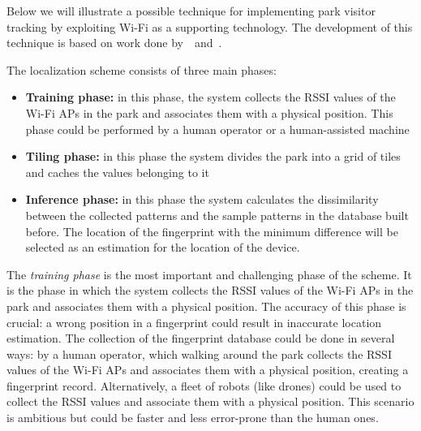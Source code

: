 Below we will illustrate a possible technique for implementing park visitor tracking by exploiting Wi-Fi as a supporting technology. The development
of this technique is based on work done by~\cite{du2018hybrid}~and~\cite{chaudhry2013indoor}.

The localization scheme consists of three main phases:

\begin{itemize}
	\item \textbf{Training phase:} in this phase, the system collects the RSSI values of the Wi-Fi APs in the park and associates them with a
	      physical position. This phase could be performed by a human operator or a human-assisted machine
	\item \textbf{Tiling phase:} in this phase the system divides the park into a grid of tiles and caches the values belonging to it
	\item \textbf{Inference phase:} in this phase the system calculates the dissimilarity between the collected patterns and the sample
	      patterns in the database built before. The location of the fingerprint with the minimum difference will be selected as an estimation for the
	      location of the device.
\end{itemize}

The \textit{training phase} is the most important and challenging phase of the scheme. It is the phase in which the system collects the RSSI values
of the Wi-Fi APs in the park and associates them with a physical position. The accuracy of this phase is crucial: a wrong position in a fingerprint
could result in inaccurate location estimation. The collection of the fingerprint database could be done in several ways: by a human operator, which
walking around the park collects the RSSI values of the Wi-Fi APs and associates them with a physical position, creating a fingerprint record.
Alternatively, a fleet of robots (like drones) could be used to collect the RSSI values and associate them with a physical position. This scenario is
ambitious but could be faster and less error-prone than the human ones.

